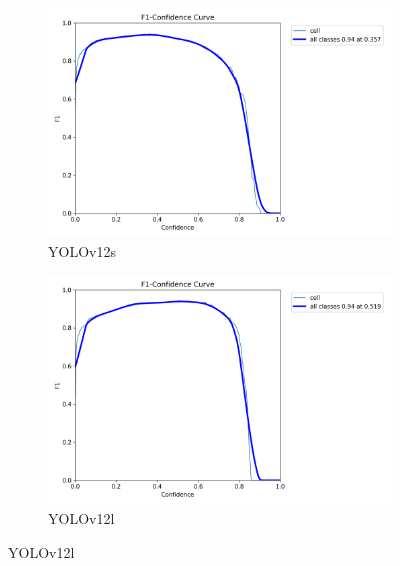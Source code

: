 \documentclass[12pt,a4paper,onecolumn,oneside]{report}
\begin{document}
\begin{figure}[H]
  \vspace{0.5cm}
  \begin{subfigure}[b]{0.48\textwidth}
    \centering
    \includegraphics[width=\textwidth]{figuras/resultados experimentacion/yolov12s/test2/BoxF1_curve.png}
    \caption{YOLOv12s}
    \label{fig:yolov12s_test2}
  \end{subfigure}
  \hfill
  \begin{subfigure}[b]{0.48\textwidth}
    \centering
    \includegraphics[width=\textwidth]{figuras/resultados experimentacion/yolov12l/test2/BoxF1_curve.png}
    \caption{YOLOv12l}
    \label{fig:yolov12l_test2}
  \end{subfigure}
  

\end{figure}
\end{document}
